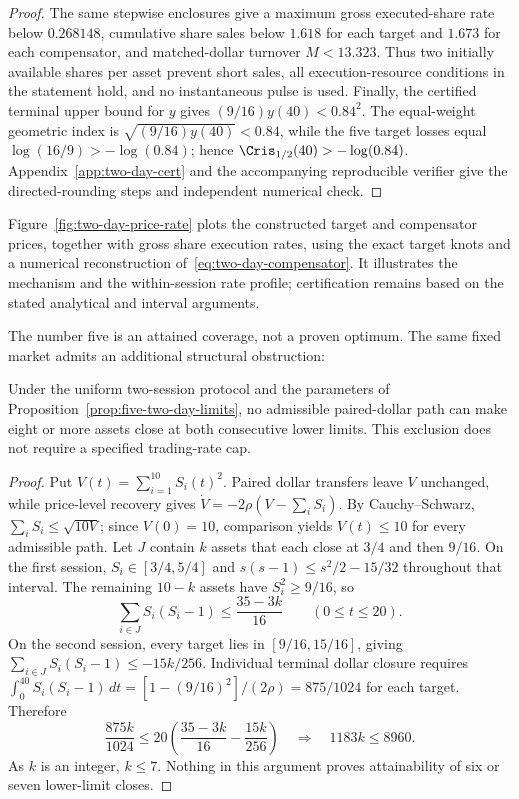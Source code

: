 \documentclass[review,hidelinks,onefignum,onetabnum]{siamonline250211}
\begin{document}
\begin{proof}
The same stepwise enclosures give a maximum gross executed-share rate below $0.268148$, cumulative share sales below $1.618$ for each target and $1.673$ for each compensator, and matched-dollar turnover $M<13.323$. Thus two initially available shares per asset prevent short sales, all execution-resource conditions in the statement hold, and no instantaneous pulse is used. Finally, the certified terminal upper bound for $y$ gives $(9/16)y(40)<0.84^2$. The equal-weight geometric index is $\sqrt{(9/16)y(40)}<0.84$, while the five target losses equal $\log(16/9)>-\log(0.84)$; hence $\Cris_{1/2}(40)>-\log(0.84)$. Appendix~\ref{app:two-day-cert} and the accompanying reproducible verifier give the directed-rounding steps and independent numerical check.
\end{proof}

Figure~\ref{fig:two-day-price-rate} plots the constructed target and compensator prices, together with gross share execution rates, using the exact target knots and a numerical reconstruction of~\eqref{eq:two-day-compensator}. It illustrates the mechanism and the within-session rate profile; certification remains based on the stated analytical and interval arguments.



The number five is an attained coverage, not a proven optimum. The same fixed market admits an additional structural obstruction:

\begin{proposition}\label{prop:two-day-coverage-obstruction}
Under the uniform two-session protocol and the parameters of Proposition~\ref{prop:five-two-day-limits}, no admissible paired-dollar path can make eight or more assets close at both consecutive lower limits. This exclusion does not require a specified trading-rate cap.
\end{proposition}
\begin{proof}
Put $V(t)=\sum_{i=1}^{10}S_i(t)^2$. Paired dollar transfers leave $V$ unchanged, while price-level recovery gives
$\dot V=-2\rho(V-\sum_iS_i)$.
By Cauchy--Schwarz, $\sum_iS_i\le\sqrt{10V}$; since $V(0)=10$, comparison yields $V(t)\le10$ for every admissible path. Let $J$ contain $k$ assets that each close at $3/4$ and then $9/16$. On the first session, $S_i\in[3/4,5/4]$ and
$s(s-1)\le s^2/2-15/32$ throughout that interval. The remaining $10-k$ assets have $S_i^2\ge9/16$, so
\[
\sum_{i\in J}S_i(S_i-1)\le\frac{35-3k}{16}
\qquad(0\le t\le20).
\]
On the second session, every target lies in $[9/16,15/16]$, giving
$\sum_{i\in J}S_i(S_i-1)\le-15k/256$.
Individual terminal dollar closure requires
$\int_0^{40}S_i(S_i-1)\,dt=[1-(9/16)^2]/(2\rho)=875/1024$
for each target. Therefore
\[
 \frac{875k}{1024}
 \le20\left(\frac{35-3k}{16}-\frac{15k}{256}\right)
 \quad\Longrightarrow\quad1183k\le8960.
\]
As $k$ is an integer, $k\le7$. Nothing in this argument proves attainability of six or seven lower-limit closes.
\end{proof}
\end{document}
